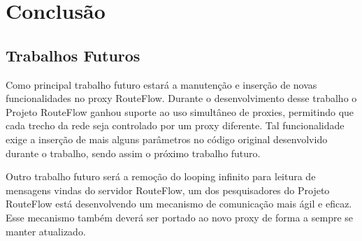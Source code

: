 \chapter{Conclusão}

\section{Trabalhos Futuros}

Como principal trabalho futuro estará a manutenção e 
inserção de novas funcionalidades no proxy RouteFlow.
Durante o desenvolvimento desse trabalho o Projeto
 RouteFlow ganhou suporte ao uso simultâneo de proxies, 
permitindo que cada trecho da rede seja controlado por um
proxy diferente. Tal funcionalidade exige a inserção de 
mais alguns parâmetros no código original desenvolvido
 durante o trabalho, sendo assim o próximo trabalho futuro.

Outro trabalho futuro será a remoção do looping infinito 
para leitura de mensagens vindas do servidor RouteFlow, 
um dos pesquisadores do Projeto RouteFlow está
desenvolvendo um mecanismo de comunicação mais ágil e
 eficaz. Esse mecanismo também deverá ser portado ao 
 novo proxy de forma a sempre se manter atualizado.

